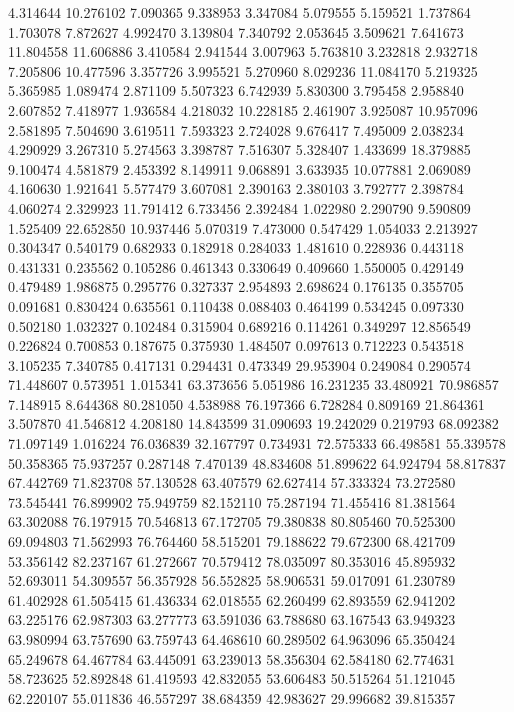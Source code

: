 4.314644
10.276102
7.090365
9.338953
3.347084
5.079555
5.159521
1.737864
1.703078
7.872627
4.992470
3.139804
7.340792
2.053645
3.509621
7.641673
11.804558
11.606886
3.410584
2.941544
3.007963
5.763810
3.232818
2.932718
7.205806
10.477596
3.357726
3.995521
5.270960
8.029236
11.084170
5.219325
5.365985
1.089474
2.871109
5.507323
6.742939
5.830300
3.795458
2.958840
2.607852
7.418977
1.936584
4.218032
10.228185
2.461907
3.925087
10.957096
2.581895
7.504690
3.619511
7.593323
2.724028
9.676417
7.495009
2.038234
4.290929
3.267310
5.274563
3.398787
7.516307
5.328407
1.433699
18.379885
9.100474
4.581879
2.453392
8.149911
9.068891
3.633935
10.077881
2.069089
4.160630
1.921641
5.577479
3.607081
2.390163
2.380103
3.792777
2.398784
4.060274
2.329923
11.791412
6.733456
2.392484
1.022980
2.290790
9.590809
1.525409
22.652850
10.937446
5.070319
7.473000
0.547429
1.054033
2.213927
0.304347
0.540179
0.682933
0.182918
0.284033
1.481610
0.228936
0.443118
0.431331
0.235562
0.105286
0.461343
0.330649
0.409660
1.550005
0.429149
0.479489
1.986875
0.295776
0.327337
2.954893
2.698624
0.176135
0.355705
0.091681
0.830424
0.635561
0.110438
0.088403
0.464199
0.534245
0.097330
0.502180
1.032327
0.102484
0.315904
0.689216
0.114261
0.349297
12.856549
0.226824
0.700853
0.187675
0.375930
1.484507
0.097613
0.712223
0.543518
3.105235
7.340785
0.417131
0.294431
0.473349
29.953904
0.249084
0.290574
71.448607
0.573951
1.015341
63.373656
5.051986
16.231235
33.480921
70.986857
7.148915
8.644368
80.281050
4.538988
76.197366
6.728284
0.809169
21.864361
3.507870
41.546812
4.208180
14.843599
31.090693
19.242029
0.219793
68.092382
71.097149
1.016224
76.036839
32.167797
0.734931
72.575333
66.498581
55.339578
50.358365
75.937257
0.287148
7.470139
48.834608
51.899622
64.924794
58.817837
67.442769
71.823708
57.130528
63.407579
62.627414
57.333324
73.272580
73.545441
76.899902
75.949759
82.152110
75.287194
71.455416
81.381564
63.302088
76.197915
70.546813
67.172705
79.380838
80.805460
70.525300
69.094803
71.562993
76.764460
58.515201
79.188622
79.672300
68.421709
53.356142
82.237167
61.272667
70.579412
78.035097
80.353016
45.895932
52.693011
54.309557
56.357928
56.552825
58.906531
59.017091
61.230789
61.402928
61.505415
61.436334
62.018555
62.260499
62.893559
62.941202
63.225176
62.987303
63.277773
63.591036
63.788680
63.167543
63.949323
63.980994
63.757690
63.759743
64.468610
60.289502
64.963096
65.350424
65.249678
64.467784
63.445091
63.239013
58.356304
62.584180
62.774631
58.723625
52.892848
61.419593
42.832055
53.606483
50.515264
51.121045
62.220107
55.011836
46.557297
38.684359
42.983627
29.996682
39.815357
